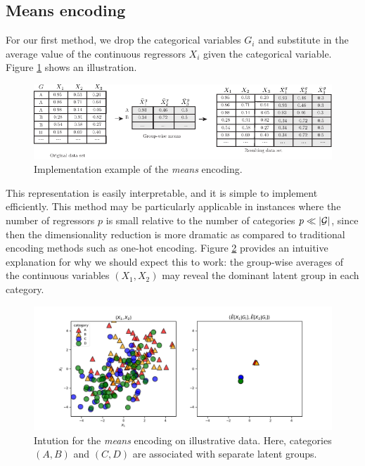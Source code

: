 \documentclass{article}
\theoremstyle{plain}
\theoremstyle{definition}
\theoremstyle{remark}
\begin{document}
\subsection{Means encoding}
\label{subsec:means}

For our first method, we drop the categorical variables $G_{i}$ and substitute in the average value of the continuous regressors $X_{i}$ given the categorical variable. Figure \ref{fig:means_encoding} shows an illustration.


\begin{figure}[H]
  \centering
  \includegraphics[width=\textwidth]{figures/means_encoding.pdf}
  \caption{Implementation example of the \emph{means} encoding.\protect\footnotemark}
  \label{fig:means_encoding}
\end{figure}


This representation is easily interpretable, and it is simple to implement efficiently. This method may be particularly applicable in instances where the number of regressors $p$ is small relative to the number of categories $p \ll |\mathcal{G}|$, since then the dimensionality reduction is more dramatic as compared to traditional encoding methods such as one-hot encoding.
Figure \ref{fig:means_intuition} provides an intuitive explanation for why we should expect this to work: the group-wise averages of the continuous variables $(X_{1}, {X_{2}})$ may reveal the dominant latent group in each category.

\begin{figure}[H]
  \centering
  \includegraphics[width=\textwidth]{figures/means_intuition.pdf}
  \caption{Intution for the \emph{means} encoding on illustrative data. Here, categories $(A,B)$ and $(C,D)$ are associated with separate latent groups.}
  \label{fig:means_intuition}
\end{figure}
\end{document}
